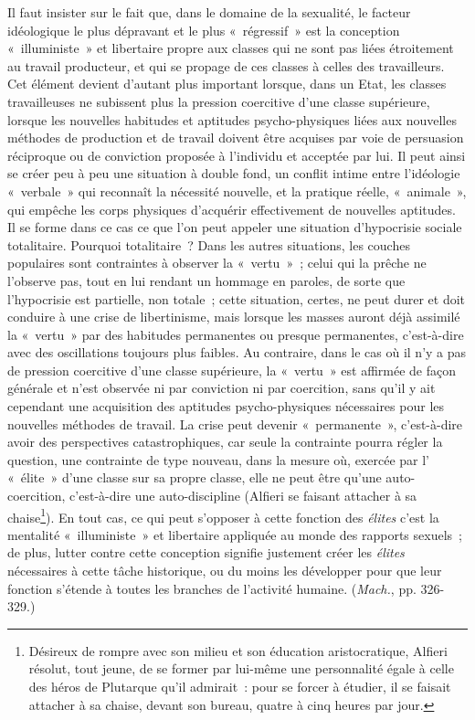 \documentclass[french,twoside]{book} %
\begin{document}
Il faut insister sur le fait que, dans le domaine de la sexualité, le facteur idéologique le plus dépravant et le plus « régressif » est la conception « illuministe » et libertaire propre aux classes qui ne sont pas liées étroitement au travail producteur, et qui se propage de ces classes à celles des travailleurs. Cet élément devient d’autant plus important lorsque, dans un Etat, les classes travailleuses ne subissent plus la pression coercitive d’une classe supérieure, lorsque les nouvelles habitudes et aptitudes psycho-physiques liées aux nouvelles méthodes de production et de travail doivent être acquises par voie de persuasion réciproque ou de conviction proposée à l’individu et acceptée par lui. Il peut ainsi se créer peu à peu une situation à double fond, un conflit intime entre l’idéologie « verbale » qui reconnaît la nécessité nouvelle, et la pratique réelle, « animale », qui empêche les corps physiques d’acquérir effectivement de nouvelles aptitudes. Il se forme dans ce cas ce que l’on peut appeler une situation d’hypocrisie sociale totalitaire. Pourquoi totalitaire ? Dans les autres situations, les couches populaires sont contraintes à observer la « vertu » ; celui qui la prêche ne l’observe pas, tout en lui rendant un hommage en paroles, de sorte que l’hypocrisie est partielle, non totale ; cette situation, certes, ne peut durer et doit conduire à une crise de libertinisme, mais lorsque les masses auront déjà assimilé la « vertu » par des habitudes permanentes ou presque permanentes, c’est-à-dire avec des oscillations toujours plus faibles. Au contraire, dans le cas où il n’y a pas de pression coercitive d’une classe supérieure, la « vertu » est affirmée de façon générale et n’est observée ni par conviction ni par coercition, sans qu’il y ait cependant une acquisition des aptitudes psycho-physiques nécessaires pour les nouvelles méthodes de travail. La crise peut devenir « permanente », c’est-à-dire avoir des perspectives catastrophiques, car seule la contrainte pourra régler la question, une contrainte de type nouveau, dans la mesure où, exercée par l’ « élite » d’une classe sur sa propre classe, elle ne peut être qu’une auto-coercition, c’est-à-dire une auto-discipline (Alfieri se faisant attacher à sa chaise\footnote{Désireux de rompre avec son milieu et son éducation aristocratique, Alfieri résolut, tout jeune, de se former par lui-même une personnalité égale à celle des héros de Plutarque qu’il admirait : pour se forcer à étudier, il se faisait attacher à sa chaise, devant son bureau, quatre à cinq heures par jour.}). En tout cas, ce qui peut s’opposer à cette fonction des \emph{élites} c’est la mentalité « illuministe » et libertaire appliquée au monde des rapports sexuels ; de plus, lutter contre cette conception signifie justement créer les \emph{élites} nécessaires à cette tâche historique, ou du moins les développer pour que leur fonction s’étende à toutes les branches de l’activité humaine. (\emph{Mach.}, pp. 326-329.)
\end{document}
